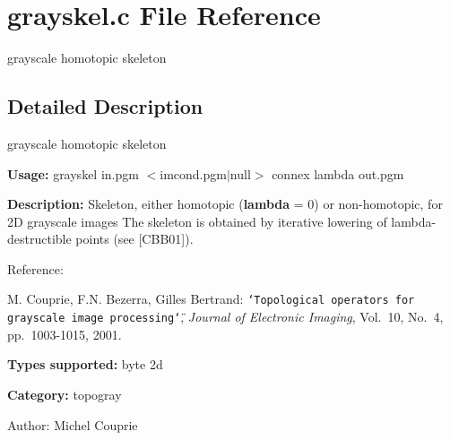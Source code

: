 \section{grayskel.c File Reference}
\label{grayskel_8c}
grayscale homotopic skeleton  




\label{_details}
\subsection{Detailed Description}
grayscale homotopic skeleton 

{\bf Usage:} grayskel in.pgm $<$imcond.pgm$|$null$>$ connex lambda out.pgm

{\bf Description:} Skeleton, either homotopic ({\bf lambda} = 0) or non-homotopic, for 2D grayscale images The skeleton is obtained by iterative lowering of lambda-destructible points (see [CBB01]).

Reference:\par
 [CBB01] M. Couprie, F.N. Bezerra, Gilles Bertrand: {\tt \char`\"{}Topological operators for grayscale image processing\char`\"{}}, {\em  Journal of Electronic Imaging\/}, Vol.~10, No.~4, pp.~1003-1015, 2001.

{\bf Types supported:} byte 2d

{\bf Category:} topogray

\begin{Desc}
\item[Author:]Michel Couprie \end{Desc}
